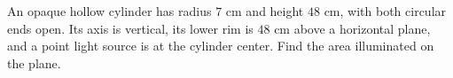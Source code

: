 An opaque hollow cylinder has radius $7$ cm and height $48$ cm, with both circular ends open. Its axis is vertical, its lower rim is $48$ cm above a horizontal plane, and a point light source is at the cylinder center. Find the area illuminated on the plane.
